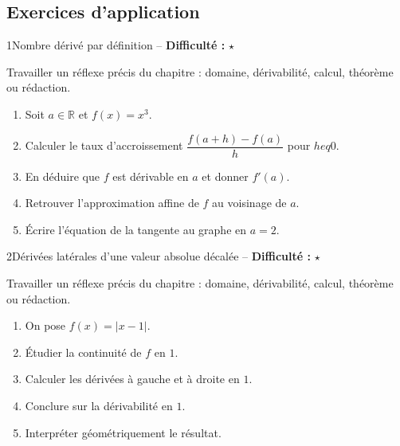 \documentclass[11pt,a4paper]{article}
\newcommand{\R}{\mathbb{R}}
\newcommand{\etoiles}[1]{\textbf{Difficulté :} #1}
\begin{document}
\subsection{Exercices d'application}

\begin{exobox}{1}{Nombre dérivé par définition -- \etoiles{$\star$}}

\begin{objectifbox}
Travailler un réflexe précis du chapitre : domaine, dérivabilité, calcul, théorème ou rédaction.
\end{objectifbox}

\begin{enumerate}

\item Soit $a\in\R$ et $f(x)=x^3$.

\item Calculer le taux d'accroissement $\dfrac{f(a+h)-f(a)}{h}$ pour $h
eq0$.

\item En déduire que $f$ est dérivable en $a$ et donner $f'(a)$.

\item Retrouver l'approximation affine de $f$ au voisinage de $a$.

\item Écrire l'équation de la tangente au graphe en $a=2$.

\end{enumerate}

\end{exobox}


\begin{exobox}{2}{Dérivées latérales d'une valeur absolue décalée -- \etoiles{$\star$}}

\begin{objectifbox}
Travailler un réflexe précis du chapitre : domaine, dérivabilité, calcul, théorème ou rédaction.
\end{objectifbox}

\begin{enumerate}

\item On pose $f(x)=|x-1|$.

\item Étudier la continuité de $f$ en $1$.

\item Calculer les dérivées à gauche et à droite en $1$.

\item Conclure sur la dérivabilité en $1$.

\item Interpréter géométriquement le résultat.

\end{enumerate}

\end{exobox}
\end{document}
